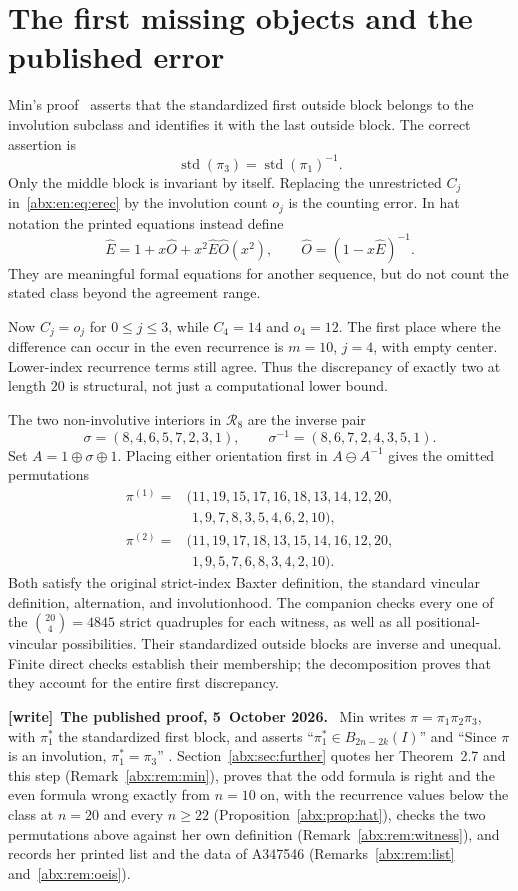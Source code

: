 \documentclass[11pt,letterpaper]{article}
\numberwithin{equation}{section}
\theoremstyle{remark}\newtheorem{remark}[theorem]{Remark}
\newcommand{\RR}{\mathcal R}
\newcommand{\std}{\operatorname{std}}
\newenvironment{writenote}[1][]{\par\smallskip\begingroup\small
 \noindent\textbf{[write]}\if\relax\detokenize{#1}\relax\else~\textbf{#1.}\fi\ }%
 {\par\endgroup\smallskip}
\begin{document}
\section{The first missing objects and the published error}\label{abx:en:sec:error}
Min's proof~\cite[p.~256]{min2021} asserts that the standardized first
outside block belongs to the involution subclass and identifies it with
the last outside block. The correct assertion is
\[
 \std(\pi_3)=\std(\pi_1)^{-1}.
\]
Only the middle block is invariant by itself. Replacing the unrestricted
$C_j$ in~\eqref{abx:en:eq:erec} by the involution count $o_j$ is the counting
error. In hat notation the printed equations instead define
\[
 \widehat E=1+x\widehat O+x^2\widehat E\widehat O(x^2),
 \qquad \widehat O=(1-x\widehat E)^{-1}.
\]
They are meaningful formal equations for another sequence, but do not
count the stated class beyond the agreement range.

Now $C_j=o_j$ for $0\le j\le3$, while $C_4=14$ and $o_4=12$.
The first place where the difference can occur in the even recurrence
is $m=10$, $j=4$, with empty center. Lower-index recurrence terms still
agree. Thus the discrepancy of exactly two at length $20$ is structural,
not just a computational lower bound.

The two non-involutive interiors in $\RR_8$ are the inverse pair
\[
 \sigma=(8,4,6,5,7,2,3,1),\qquad
 \sigma^{-1}=(8,6,7,2,4,3,5,1).
\]
Set $A=1\oplus\sigma\oplus1$. Placing either orientation first in
$A\ominus A^{-1}$ gives the omitted permutations
\begin{align*}
\pi^{(1)}={}&(11,19,15,17,16,18,13,14,12,20,\\[-2pt]
            &\phantom{(}1,9,7,8,3,5,4,6,2,10),\\
\pi^{(2)}={}&(11,19,17,18,13,15,14,16,12,20,\\[-2pt]
            &\phantom{(}1,9,5,7,6,8,3,4,2,10).
\end{align*}
Both satisfy the original strict-index Baxter definition, the standard
vincular definition, alternation, and involutionhood. The companion
checks every one of the $\binom{20}{4}=4845$ strict quadruples for
each witness, as well as all positional-vincular possibilities. Their
standardized outside blocks are inverse and unequal. Finite direct
checks establish their membership; the decomposition proves that they
account for the entire first discrepancy.

\begin{writenote}[The published proof, 5~October 2026]
Min writes $\pi=\pi_1\pi_2\pi_3$, with $\pi_1^*$ the standardized first block, and asserts ``$\pi_1^*\in B_{2n-2k}(I)$'' and ``Since $\pi$ is an involution, $\pi_1^*=\pi_3$'' \cite[p.~256]{min2021}. Section~\ref{abx:sec:further} quotes her Theorem~2.7 and this step (Remark~\ref{abx:rem:min}), proves that the odd formula is right and the even formula wrong exactly from $n=10$ on, with the recurrence values below the class at $n=20$ and every $n\ge22$ (Proposition~\ref{abx:prop:hat}), checks the two permutations above against her own definition (Remark~\ref{abx:rem:witness}), and records her printed list and the data of A347546 (Remarks~\ref{abx:rem:list} and~\ref{abx:rem:oeis}).
\end{writenote}
\end{document}
